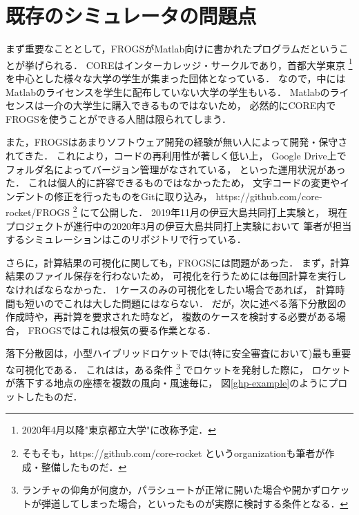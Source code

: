 \documentclass[a4j,10pt]{jsarticle}
\begin{document}
\section{既存のシミュレータの問題点}


まず重要なこととして，FROGSがMatlab向けに書かれたプログラムだということが挙げられる．
COREはインターカレッジ・サークルであり，首都大学東京
\footnote{2020年4月以降"東京都立大学"に改称予定．}
を中心とした様々な大学の学生が集まった団体となっている．
なので，中にはMatlabのライセンスを学生に配布していない大学の学生もいる．
Matlabのライセンスは一介の大学生に購入できるものではないため，
必然的にCORE内でFROGSを使うことができる人間は限られてしまう．

また，FROGSはあまりソフトウェア開発の経験が無い人によって開発・保守されてきた．
これにより，コードの再利用性が著しく低い上，
Google Drive上でフォルダ名によってバージョン管理がなされている，
といった運用状況があった．
これは個人的に許容できるものではなかったため，
文字コードの変更やインデントの修正を行ったものをGitに取り込み，
https://github.com/core-rocket/FROGS
\footnote{そもそも，https://github.com/core-rocket というorganizationも筆者が作成・整備したものだ．}
にて公開した．
2019年11月の伊豆大島共同打上実験と，
現在プロジェクトが進行中の2020年3月の伊豆大島共同打上実験において
筆者が担当するシミュレーションはこのリポジトリで行っている．

さらに，計算結果の可視化に関しても，FROGSには問題があった．
まず，計算結果のファイル保存を行わないため，
可視化を行うためには毎回計算を実行しなければならなかった．
1ケースのみの可視化をしたい場合であれば，
計算時間も短いのでこれは大した問題にはならない．
だが，次に述べる落下分散図の作成時や，再計算を要求された時など，
複数のケースを検討する必要がある場合，
FROGSではこれは根気の要る作業となる．

落下分散図は，小型ハイブリッドロケットでは(特に安全審査において)最も重要な可視化である．
これはは，ある条件
\footnote{ランチャの仰角が何度か，パラシュートが正常に開いた場合や開かずロケットが弾道してしまった場合，といったものが実際に検討する条件となる．}
でロケットを発射した際に，
ロケットが落下する地点の座標を複数の風向・風速毎に，
図\ref{ghp-example}のようにプロットしたものだ．
\end{document}
